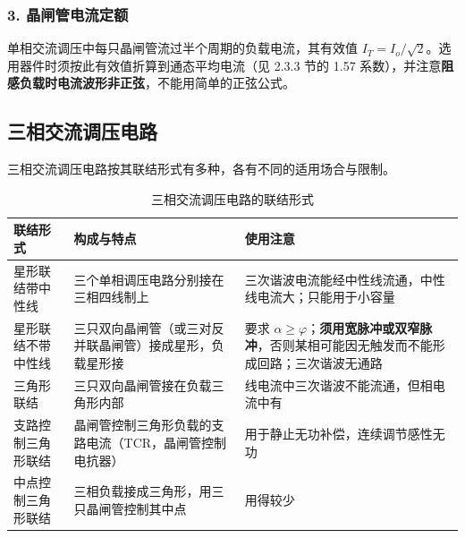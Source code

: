 

\subsubsection*{3. 晶闸管电流定额}

单相交流调压中每只晶闸管流过半个周期的负载电流，其有效值 $I_T=I_o/\sqrt{2}$。选用器件时须按此有效值折算到通态平均电流（见 2.3.3 节的 1.57 系数），并注意\textbf{阻感负载时电流波形非正弦}，不能用简单的正弦公式。

\subsection{三相交流调压电路}

三相交流调压电路按其联结形式有多种，各有不同的适用场合与限制。

\begin{table}[htbp]
\centering
\caption{三相交流调压电路的联结形式}
\label{tab:6-1}
\begin{tabular}{p{3.6cm}p{4.6cm}p{6.2cm}}
\toprule
\textbf{联结形式} & \textbf{构成与特点} & \textbf{使用注意} \\
\midrule
星形联结带中性线 & 三个单相调压电路分别接在三相四线制上 & 三次谐波电流能经中性线流通，中性线电流大；只能用于小容量 \\
星形联结不带中性线 & 三只双向晶闸管（或三对反并联晶闸管）接成星形，负载星形接 & 要求 $\alpha\ge\varphi$；\textbf{须用宽脉冲或双窄脉冲}，否则某相可能因无触发而不能形成回路；三次谐波无通路 \\
三角形联结 & 三只双向晶闸管接在负载三角形内部 & 线电流中三次谐波不能流通，但相电流中有 \\
支路控制三角形联结 & 晶闸管控制三角形负载的支路电流（TCR，晶闸管控制电抗器） & 用于静止无功补偿，连续调节感性无功 \\
中点控制三角形联结 & 三相负载接成三角形，用三只晶闸管控制其中点 & 用得较少 \\
\bottomrule
\end{tabular}
\end{table}

